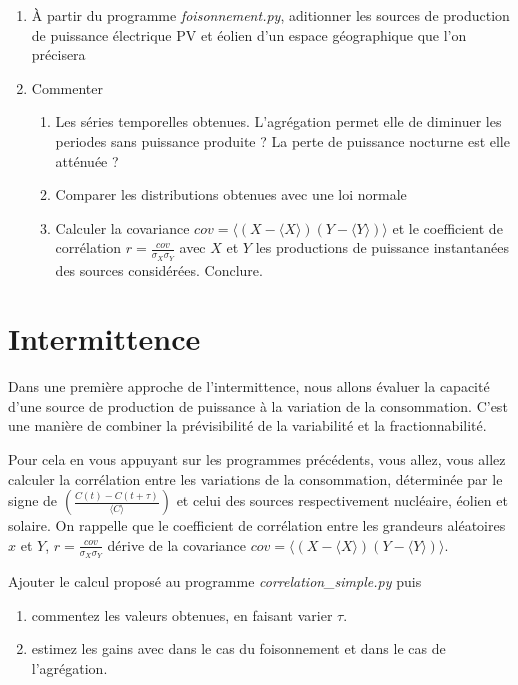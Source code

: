 \documentclass[12pt,a4]{article}
\newcommand{\tmtextit}[1]{{\itshape{#1}}}
\begin{document}
\begin{enumerate}
  \item À partir du programme \tmtextit{foisonnement.py}, aditionner les
  sources de production de puissance électrique PV et éolien d'un espace géographique que l'on précisera 
  
  \item Commenter
  \begin{enumerate}
    \item Les séries temporelles obtenues. L'agrégation permet elle de
    diminuer les periodes sans puissance produite ? La perte de puissance
    nocturne est elle atténuée ?
    
    \item Comparer les distributions obtenues avec une loi normale
    
    \item Calculer la covariance $cov=\langle (X-\langle X \rangle)(Y - \langle Y \rangle)\rangle $ et le coefficient de corrélation $r=\frac{cov}{\sigma_X \sigma_Y}$ avec $X$ et $Y$ les productions de puissance instantanées des sources considérées. Conclure.
    
  \end{enumerate}
\end{enumerate}

\section{Intermittence}

Dans une première approche de l'intermittence, nous allons évaluer la
capacité d'une source de production de puissance à la variation de la consommation. C'est une manière de combiner la prévisibilité de la variabilité et la fractionnabilité.

Pour cela en vous appuyant sur les programmes précédents, vous allez, vous allez calculer la corrélation entre les variations de la consommation, déterminée par le signe de $\left( \frac{C (t) - C (t + \tau)}{\langle C \rangle} \right)$ et celui des sources respectivement nucléaire, éolien et solaire.
On rappelle que le coefficient de corrélation entre les grandeurs aléatoires $x$ et $Y$, $r=\frac{cov}{\sigma_X \sigma_Y}$ dérive de la covariance $cov=\langle (X-\langle X \rangle)(Y - \langle Y \rangle)\rangle $.

Ajouter le calcul proposé au programme \tmtextit{correlation\_simple.py} puis
\begin{enumerate}
	\item commentez les valeurs obtenues, en faisant varier $\tau$.
	
	\item estimez les gains avec dans le cas du foisonnement et dans le cas de l'agrégation.
	
\end{enumerate}
\end{document}

